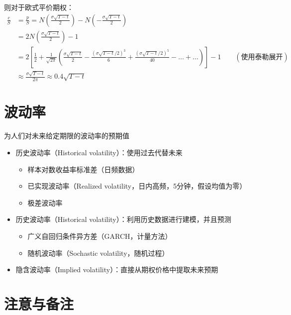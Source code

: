 \documentclass[11pt]{article}
\begin{document}
则对于欧式平价期权：
\begin{align*}
    \frac{c}{S} & = \frac{p}{S} = N \left( \frac{\sigma\sqrt{T-t}}{2} \right) - N\left( -\frac{\sigma\sqrt{T-t}}{2} \right) \\
    & = 2N\left( \frac{\sigma\sqrt{T-t}}{2} \right) - 1 \\
    & = 2\left[\frac{1}{2} + \frac{1}{\sqrt{2\pi}} \left(\frac{\sigma\sqrt{T-t}}{2} - \frac{(\sigma\sqrt{T-t}/2)^3}{6} + \frac{(\sigma\sqrt{T-t}/2)^5}{40} - \dots + \dots\right) \right] - 1 \qquad (\text{使用泰勒展开}) \\
    & \approx \frac{\sigma\sqrt{T-t}}{2\pi} \approx 0.4\sqrt{T-t}
\end{align*}

\section{波动率}

为人们对未来给定期限的波动率的预期值
\begin{itemize}
    \item 历史波动率（Historical volatility）：使用过去代替未来
          \begin{itemize}
              \item 样本对数收益率标准差（日频数据）
              \item 已实现波动率（Realized volatility，日内高频，5分钟，假设均值为零）
              \item 极差波动率
          \end{itemize}
    \item 历史波动率（Historical volatility）：利用历史数据进行建模，并且预测
          \begin{itemize}
              \item 广义自回归条件异方差（GARCH，计量方法）
              \item 随机波动率（Sochastic volatility，随机过程）
          \end{itemize}
    \item 隐含波动率（Implied volatility）：直接从期权价格中提取未来预期
\end{itemize}

\section{注意与备注}
\end{document}
